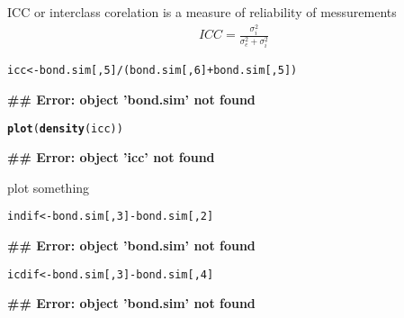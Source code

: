 \documentclass[12pt,letterpaper,oneside]{article}\usepackage{graphicx, color}
\makeatletter
\newcommand{\hlfunctioncall}[1]{\textcolor[rgb]{0.501960784313725,0,0.329411764705882}{\textbf{#1}}}%
\newenvironment{kframe}{%
 \def\at@end@of@kframe{}%
 \ifinner\ifhmode%
  \def\at@end@of@kframe{\end{minipage}}%
  \begin{minipage}{\columnwidth}%
 \fi\fi%
 \def\FrameCommand##1{\hskip\@totalleftmargin \hskip-\fboxsep
 \colorbox{shadecolor}{##1}\hskip-\fboxsep
     \hskip-\linewidth \hskip-\@totalleftmargin \hskip\columnwidth}%
 \MakeFramed {\advance\hsize-\width
   \@totalleftmargin\z@ \linewidth\hsize
   \@setminipage}}%
 {\par\unskip\endMakeFramed%
 \at@end@of@kframe}
\newenvironment{knitrout}{}{} %
\makeatother
\begin{document}
ICC or interclass corelation is a measure of reliability of messurements
\begin{align}
    ICC = \frac{\sigma^{2}_{i}}{\sigma^{2}_{e}+\sigma^{2}_{i}}
\end{align}
\begin{knitrout}\scriptsize
{}\color{fgcolor}\begin{kframe}
\begin{alltt}
icc <- bond.sim[, 5]/(bond.sim[, 6] + bond.sim[, 5])
\end{alltt}


{\ttfamily\noindent\bfseries\textcolor{errorcolor}{\#\# Error: object 'bond.sim' not found}}\begin{alltt}
\hlfunctioncall{plot}(\hlfunctioncall{density}(icc))
\end{alltt}


{\ttfamily\noindent\bfseries\textcolor{errorcolor}{\#\# Error: object 'icc' not found}}\end{kframe}
\end{knitrout}


plot something
\begin{knitrout}\scriptsize
{}\color{fgcolor}\begin{kframe}
\begin{alltt}
indif <- bond.sim[, 3] - bond.sim[, 2]
\end{alltt}


{\ttfamily\noindent\bfseries\textcolor{errorcolor}{\#\# Error: object 'bond.sim' not found}}\begin{alltt}
icdif <- bond.sim[, 3] - bond.sim[, 4]
\end{alltt}


{\ttfamily\noindent\bfseries\textcolor{errorcolor}{\#\# Error: object 'bond.sim' not found}}\end{kframe}
\end{knitrout}
\end{document}
